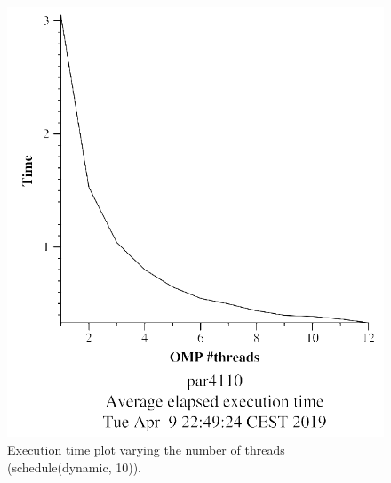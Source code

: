 \documentclass[12pt, a4paper]{article}
\begin{document}
\begin{figure}[H]
\centering
\begin{minipage}[b]{0.4\linewidth}
  \centering
  \includegraphics[scale=0.5]{./mandel-omp-10000-strong-omp-for-dynamic-800-time}
  \caption{Execution time plot varying the number of threads (schedule(dynamic, 10)).}
  \label{fig:mandel-omp-10000-strong-omp-for-dynamic-800-time}
\end{minipage}%
\hspace{0.5cm}
\begin{minipage}[b]{0.4\linewidth}
  \centering

\end{minipage}
\end{figure}
\end{document}
